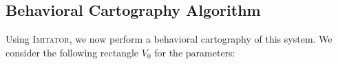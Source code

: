 \documentclass[a4paper,10pt]{article}
\newcommand{\imitator}{\textsc{Imitator}}
\begin{document}
% 
% 
% 
% 
% 
% 
% 
% 
% 
% 
% 
% 
% 
% 
% 
% 

\subsection{Behavioral Cartography Algorithm}


Using \imitator{}, we now perform a behavioral cartography of this system.
We consider the following rectangle $V_0$ for the parameters:
\end{document}
